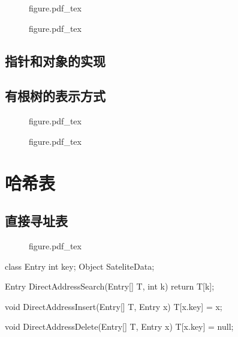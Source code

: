\documentclass[oneside,10pt,fontset=none]{ctexbook}
\numberwithin{definition}{chapter}
\numberwithin{theorem}{chapter}
\numberwithin{lemma}{chapter}
\begin{document}
\begin{figure}[htbp]
    \def\svgwidth{\columnwidth}
    {figure.pdf_tex}
\end{figure}

\begin{figure}[htbp]
    \def\svgwidth{\columnwidth}
    {figure.pdf_tex}
\end{figure}

\section{指针和对象的实现}

\section{有根树的表示方式}

\begin{figure}[htbp]
    \def\svgwidth{\columnwidth}
    {figure.pdf_tex}
\end{figure}

\begin{figure}[htbp]
    \def\svgwidth{\columnwidth}
    {figure.pdf_tex}
\end{figure}

\chapter{哈希表}

\section{直接寻址表}

\begin{figure}[htbp]
    \def\svgwidth{\columnwidth}
    {figure.pdf_tex}
\end{figure}

\begin{myjava}{}{}
class Entry {
    int key;
    Object SateliteData;
}

Entry DirectAddressSearch(Entry[] T, int k) {
    return T[k];
}

void DirectAddressInsert(Entry[] T, Entry x) {
    T[x.key] = x;
}

void DirectAddressDelete(Entry[] T, Entry x) {
    T[x.key] = null;
}
\end{myjava}
\end{document}
